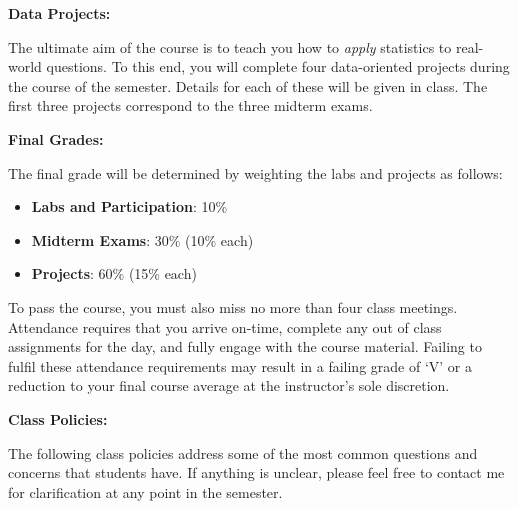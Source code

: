 \documentclass[12pt]{article}
\begin{document}
\bigskip

\textbf{Data Projects:} \vspace{6pt}

The ultimate aim of the course is to teach you how to \textit{apply} statistics
to real-world questions. To this end, you will complete four data-oriented
projects during the course of the semester. Details for each of these will be
given in class. The first three projects correspond to the three midterm exams.

\bigskip

\textbf{Final Grades:} \vspace{6pt}

The final grade will be determined by weighting the labs and projects as
follows:
\begin{itemize}\setlength\itemsep{0em}
\item \textbf{Labs and Participation}: 10\%
\item \textbf{Midterm Exams}: 30\% (10\% each)
\item \textbf{Projects}: 60\% (15\% each)
\end{itemize}
To pass the course, you must also miss no more than four class meetings.
Attendance requires that you arrive on-time, complete any out of class
assignments for the day, and fully engage with the course material.
Failing to fulfil these attendance requirements may result in a failing
grade of `V' or a reduction to your final course average at the instructor's
sole discretion.

\bigskip

\textbf{Class Policies:} \vspace{6pt}

The following class policies address some of the most common
questions and concerns that students have. If anything is
unclear, please feel free to contact me for clarification at
any point in the semester.
\end{document}
